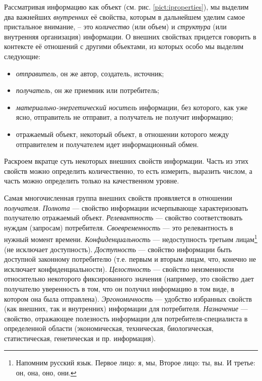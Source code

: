 Рассматривая информацию как объект (см. рис. \ref{pict:iproperties}), мы выделим два важнейших \emph{внутренних} её свойства, которым в дальнейшем уделим самое пристальное внимание, – это \emph{количество} (или объем) и \emph{структура} (или внутренняя организация) информации. 
О внешних свойствах придется говорить в контексте её отношений с другими объектами, из которых особо мы выделим следующие:
\begin{itemize}
    \item \emph{отправитель}, он же автор, создатель, источник;
    \item \emph{получатель}, он же приемник или потребитель;
    \item \emph{материально-энергетический носитель} информации, без которого, как уже ясно, отправитель не отправит, а получатель не получит информацию;
    \item отражаемый объект, некоторый объект, в отношении которого между отправителем и получателем идет информационный обмен.
\end{itemize}


Раскроем вкратце суть некоторых внешних свойств информации. Часть из этих свойств можно определить количественно, то есть измерить, выразить числом, а часть можно определить только на качественном уровне.

Самая многочисленная группа внешних свойств проявляется в отношении \emph{получателя}. \emph{Полнота} --- свойство информации исчерпывающе характеризовать получателю отражаемый объект. \emph{Релевантность} --- свойство соответствовать нуждам (запросам) потребителя. \emph{Своевременность} --- это релевантность в нужный момент времени. \emph{Конфиденциальность} --- недоступность третьим лицам\footnote{Напомним русский язык. Первое лицо: я, мы, Второе лицо: ты, вы. И третье: он, она, оно, они.} (не исключает доступность). \emph{Доступность} --- свойство информации быть доступной законному потребителю (т.е. первым и вторым лицам, что, конечно не исключает конфиденциальности). \emph{Целостность} --- свойство неизменности относительно некоторого фиксированного значения (например, это свойство дает получателю уверенность в том, что он получил информацию в том виде, в котором она была отправлена). \emph{Эргономичность} --- удобство избранных свойств (как внешних, так и внутренних) информации для потребителя. \emph{Назначение} --- свойство, отражающее полезность информации для потребителя-специалиста в определенной области (экономическая, техническая, биологическая, статистическая, генетическая и пр. информация).


